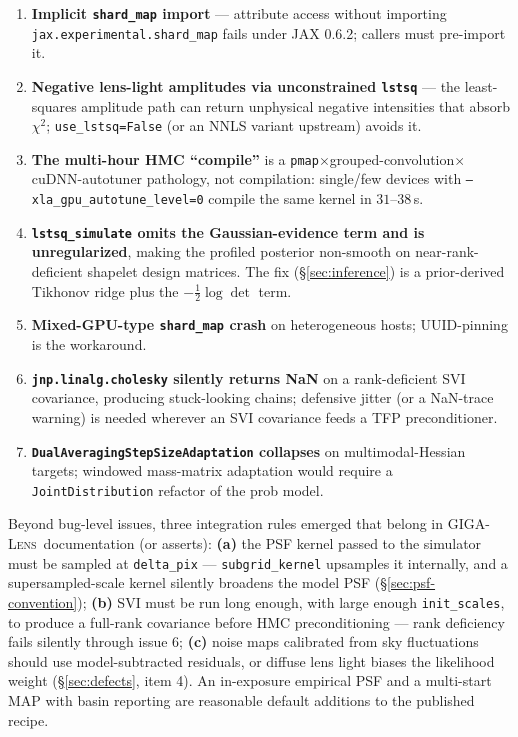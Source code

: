 \documentclass[11pt,letterpaper]{article}
\newcommand{\gigalens}{\textsc{GIGA-Lens}}
\begin{document}
\begin{enumerate}
\item {\bf Implicit \texttt{shard\_map} import} --- attribute access
without importing \texttt{jax.experimental.shard\_map} fails under
JAX 0.6.2; callers must pre-import it.
\item {\bf Negative lens-light amplitudes via unconstrained
\texttt{lstsq}} --- the least-squares amplitude path can return
unphysical negative intensities that absorb $\chi^{2}$;
\texttt{use\_lstsq=False} (or an NNLS variant upstream) avoids it.
\item {\bf The multi-hour HMC ``compile''} is a
\texttt{pmap}$\times$grouped-convolution$\times$cuDNN-autotuner
pathology, not compilation: single/few devices with
\texttt{--xla\_gpu\_autotune\_level=0} compile the same kernel in
$31$--$38$\,s.
\item {\bf \texttt{lstsq\_simulate} omits the Gaussian-evidence term
and is unregularized}, making the profiled posterior non-smooth on
near-rank-deficient shapelet design matrices. The fix
(\S\ref{sec:inference}) is a prior-derived Tikhonov ridge plus the
$-\tfrac12\log\det$ term.
\item {\bf Mixed-GPU-type \texttt{shard\_map} crash} on heterogeneous
hosts; UUID-pinning is the workaround.
\item {\bf \texttt{jnp.linalg.cholesky} silently returns NaN} on a
rank-deficient SVI covariance, producing stuck-looking chains;
defensive jitter (or a NaN-trace warning) is needed wherever an SVI
covariance feeds a TFP preconditioner.
\item {\bf \texttt{DualAveragingStepSizeAdaptation} collapses} on
multimodal-Hessian targets; windowed mass-matrix adaptation would
require a \texttt{JointDistribution} refactor of the prob model.
\end{enumerate}

Beyond bug-level issues, three integration rules emerged that belong
in \gigalens\ documentation (or asserts): {\bf (a)} the PSF kernel
passed to the simulator must be sampled at \texttt{delta\_pix} ---
\texttt{subgrid\_kernel} upsamples it internally, and a
supersampled-scale kernel silently broadens the model PSF
(\S\ref{sec:psf-convention}); {\bf (b)} SVI must be run long enough,
with large enough \texttt{init\_scales}, to produce a full-rank
covariance before HMC preconditioning --- rank deficiency fails
silently through issue 6; {\bf (c)} noise maps calibrated from sky
fluctuations should use model-subtracted residuals, or diffuse lens
light biases the likelihood weight (\S\ref{sec:defects}, item 4). An
in-exposure empirical PSF and a multi-start MAP with basin reporting
are reasonable default additions to the published recipe.
\end{document}

